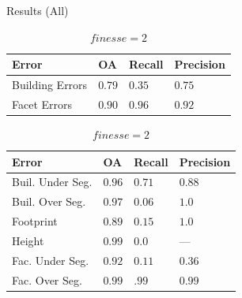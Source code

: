 \documentclass{beamer}
\begin{document}
        \begin{frame}[plain]{Results (All)}
            \begin{table}
                \begin{subtable}{.4\textwidth}
                    \tiny
                    \begin{center}
                        \begin{tabular}{x{1cm} x{.5cm} x{.5cm} x{.5cm}}
                            \toprule
                            {\bf Error} & {\bf OA} & {\bf Recall} & {\bf Precision} \\
                            \midrule
                            Building Errors & $0.79$ & $0.35$ & $0.75$ \\
                            \midrule
                            Facet Errors & $0.90$ & $0.96$ & $0.92$ \\
                            \bottomrule
                        \end{tabular}
                        \caption{\tiny\label{tab::finesse2} $finesse = 2$}
                    \end{center}
                \end{subtable}
                \begin{subtable}{.45\textwidth}
                    \tiny
                    \begin{center}
                        \begin{tabular}{x{1.75cm} x{.5cm} x{.5cm} x{.5cm}}
                            \toprule
                            {\bf Error} & {\bf OA} & {\bf Recall} & {\bf Precision} \\
                            \midrule
                            Buil. Under Seg. & $0.96$ & $0.71$ & $0.88$ \\
                            \midrule
                            Buil. Over Seg. & $0.97$ & $0.06$ & $1.0$ \\
                            \midrule
                            Footprint & $0.89$ & $0.15$ & $1.0$ \\
                            \midrule
                            Height & $0.99$ & $0.0$ & --- \\
                            \midrule
                            \midrule
                            Fac. Under Seg. & $0.92$ & $0.11$ & $0.36$ \\
                            \midrule
                            Fac. Over Seg. & $0.99$ & $.99$ & $0.99$ \\

\end{tabular}
\end{center}
\end{subtable}
\end{table}
\end{frame}
\end{document}
